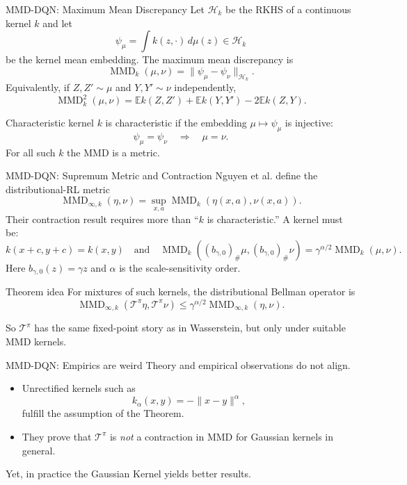 \documentclass[10pt]{beamer}
\newcommand{\E}{\mathbb{E}}
\newcommand{\T}{\mathcal{T}}
\newcommand{\1}{\mathds{1}}
\newcommand{\norm}[1]{\lVert#1\rVert}
\begin{document}
\begin{frame}{MMD-DQN: Maximum Mean Discrepancy}
  \small
  Let $\mathcal H_k$ be the RKHS of a continuous kernel $k$ and let
  \[
    \psi_\mu=\int k(z,\cdot)\,d\mu(z)\in\mathcal H_k
  \]
  be the kernel mean embedding. The maximum mean discrepancy is
  \[
    \operatorname{MMD}_k(\mu,\nu)
    =
    \norm{\psi_\mu-\psi_\nu}_{\mathcal H_k}.
  \]
  Equivalently, if $Z,Z'\sim\mu$ and $Y,Y'\sim\nu$ independently,
  \[
    \operatorname{MMD}_k^2(\mu,\nu)
    =
    \E k(Z,Z')+\E k(Y,Y')-2\E k(Z,Y).
  \]
  \begin{block}{Characteristic kernel}
    $k$ is characteristic if the embedding $\mu\mapsto\psi_\mu$ is injective:
    \[
      \psi_\mu=\psi_\nu \quad\Longrightarrow\quad \mu=\nu.
    \]
    For all such $k$ the MMD is a metric.
  \end{block}
\end{frame}

\begin{frame}{MMD-DQN: Supremum Metric and Contraction}
  \small
  Nguyen et al. define the distributional-RL metric
  \[
    \operatorname{MMD}_{\infty,k}(\eta,\nu)
    =
    \sup_{x,a}\operatorname{MMD}_k(\eta(x,a),\nu(x,a)).
  \]
  Their contraction result requires more than ``$k$ is characteristic.'' A
  kernel must be:
  \[
    k(x+c,y+c)=k(x,y)
    \quad\text{and}\quad
    \operatorname{MMD}_k((b_{\gamma,0})_\#\mu,(b_{\gamma,0})_\#\nu)
    =
    \gamma^{\alpha/2}\operatorname{MMD}_k(\mu,\nu).
  \]
  Here $b_{\gamma,0}(z)=\gamma z$ and $\alpha$ is the scale-sensitivity order.

  \begin{block}{Theorem idea}
    For mixtures of such kernels, the distributional Bellman operator is
    \[
      \operatorname{MMD}_{\infty,k}(\T^\pi\eta,\T^\pi\nu)
      \leq
      \gamma^{\alpha/2}
      \operatorname{MMD}_{\infty,k}(\eta,\nu).
    \]
  \end{block}
  So $\T^\pi$ has the same fixed-point story as in Wasserstein, but only under
  suitable MMD kernels.
\end{frame}

\begin{frame}{MMD-DQN: Empirics are weird}
  \small
  Theory and empirical observations do not align.
  \begin{itemize}
    \item Unrectified kernels such as
      \[
        k_\alpha(x,y)=-\|x-y \|^\alpha,
      \]
      fulfill the assumption of the Theorem.
    \item They prove that $\T^\pi$ is \emph{not} a contraction in
      MMD for Gaussian kernels in general. \\
  \end{itemize} 

  Yet, in practice the Gaussian Kernel yields better results. 
\end{frame}
\end{document}
